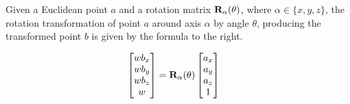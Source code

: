 \documentclass[11pt]{article}
\begin{document}
\begin{multicols}{2}

Given a Euclidean point $a$ and a rotation matrix $\text{\bf R}_\alpha(
\theta)$, where $\alpha \in \{x, y, z\}$, the rotation transformation of
point $a$ around axis $\alpha$ by angle $\theta$, producing the transformed
point $b$ is given by the formula to the right.

\vfill\columnbreak

\scriptsize
\begin{align}
    \begin{bmatrix}
        w b_x \\
        w b_y \\
        w b_z \\
        w
    \end{bmatrix}
    &=
    \text{\bf R}_\alpha(\theta)
    \begin{bmatrix}
        a_x \\
        a_y \\
        a_z \\
        1
    \end{bmatrix}
\end{align}
\normalsize
\vspace*{\fill}

\end{multicols}
\end{document}
